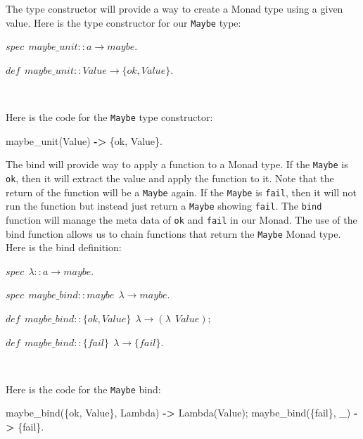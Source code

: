 \documentclass[
]{book}
\newenvironment{Shaded}{\begin{snugshade}}{\end{snugshade}}
\newcommand{\CharTok}[1]{\textcolor[rgb]{0.31,0.60,0.02}{#1}}
\newcommand{\FunctionTok}[1]{\textcolor[rgb]{0.00,0.00,0.00}{#1}}
\newcommand{\OperatorTok}[1]{\textcolor[rgb]{0.81,0.36,0.00}{\textbf{#1}}}
\newcommand{\VariableTok}[1]{\textcolor[rgb]{0.00,0.00,0.00}{#1}}
\begin{document}
The type constructor will provide a way to create a Monad type using a given value. Here is the type constructor for our \texttt{Maybe} type:

\begin{formulabox}
\(spec ~ ~ maybe\_unit :: a \rightarrow maybe.\)

\(de\mathit{f} ~ ~ maybe\_unit :: Value \rightarrow \lbrace ok, Value \rbrace.\)

\end{formulabox}

\(\nonumber\)

Here is the code for the \texttt{Maybe} type constructor:

\begin{Shaded}
\begin{Highlighting}[]
\FunctionTok{maybe\_unit(}\VariableTok{Value}\FunctionTok{)} \OperatorTok{{-}\textgreater{}} \FunctionTok{\{}\CharTok{ok}\FunctionTok{,} \VariableTok{Value}\FunctionTok{\}.}
\end{Highlighting}
\end{Shaded}

The bind will provide way to apply a function to a Monad type. If the \texttt{Maybe} is \texttt{ok}, then it will extract the value and apply the function to it. Note that the return of the function will be a \texttt{Maybe} again. If the \texttt{Maybe} is \texttt{fail}, then it will not run the function but instead just return a \texttt{Maybe} showing \texttt{fail}. The \texttt{bind} function will manage the meta data of \texttt{ok} and \texttt{fail} in our Monad. The use of the bind function allows us to chain functions that return the \texttt{Maybe} Monad type. Here is the bind definition:

\begin{formulabox}
\(spec ~ ~ \lambda :: a \rightarrow maybe.\)

\(spec ~ ~ maybe\_bind :: maybe ~ ~ \lambda \rightarrow maybe.\)

\(de\mathit{f} ~ ~ maybe\_bind :: \lbrace ok, Value \rbrace ~ ~ \lambda \rightarrow (\lambda ~ ~ Value);\)

\(de\mathit{f} ~ ~ maybe\_bind :: \lbrace fail \rbrace ~ ~ \lambda \rightarrow \lbrace fail \rbrace.\)

\end{formulabox}

\(\nonumber\)

Here is the code for the \texttt{Maybe} bind:

\begin{Shaded}
\begin{Highlighting}[]
\FunctionTok{maybe\_bind(\{}\CharTok{ok}\FunctionTok{,} \VariableTok{Value}\FunctionTok{\},} \VariableTok{Lambda}\FunctionTok{)} \OperatorTok{{-}\textgreater{}} \VariableTok{Lambda}\FunctionTok{(}\VariableTok{Value}\FunctionTok{);}
\FunctionTok{maybe\_bind(\{}\CharTok{fail}\FunctionTok{\},} \VariableTok{\_}\FunctionTok{)} \OperatorTok{{-}\textgreater{}} \FunctionTok{\{}\CharTok{fail}\FunctionTok{\}.}
\end{Highlighting}
\end{Shaded}
\end{document}
